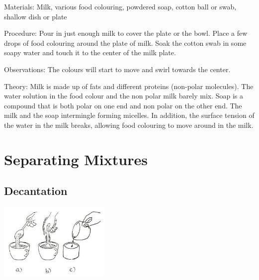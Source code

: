 \begin{multicols}{2}
\begin{description*}
\item[Materials:]{Milk, various food colouring, powdered soap, cotton ball or swab, shallow dish or plate}
\item[Procedure:]{Pour in just enough milk to cover the plate or the bowl. Place a few drops of
food colouring around the plate of milk. Soak
the cotton swab in some soapy water and touch it to the center of the
milk plate. }
\item[Observations:]{The colours will start to move and
swirl towards the center.}
\item[Theory:]{Milk is made up of fats and different proteins (non-polar molecules). The water solution in the food colour and the non polar milk barely mix. Soap
is a compound that is both polar on one end and non polar on the other
end. The milk and the soap intermingle forming micelles. In addition,
the surface tension of the water in the milk breaks, allowing
food colouring to move around in the milk. }
\end{description*}


\section*{Separating Mixtures} 


\subsection{Decantation} 

\begin{center}
\includegraphics[width=0.4\textwidth]{./img/source/decantation.jpg}
\end{center}


\end{multicols}
